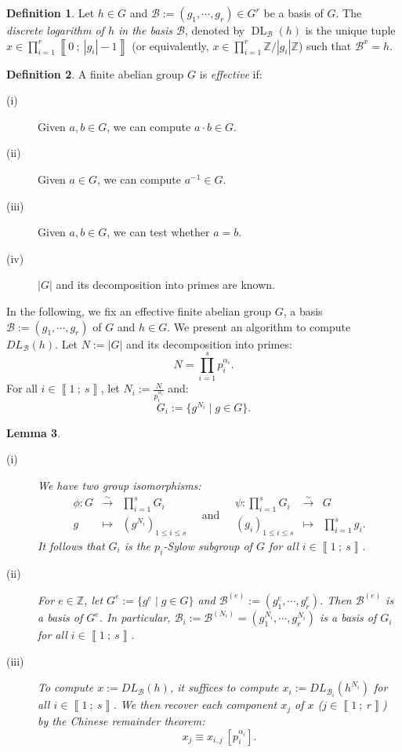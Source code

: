 \documentclass[a4paper,10pt]{report}
\theoremstyle{definition}
\newtheorem{Definition}{Definition}[chapter]
\theoremstyle{plain}
\newtheorem{Lemma}[Definition]{Lemma}
\theoremstyle{definition}
\newcommand{\Z}{\mathbb{Z}}
\newcommand{\m}[1]{\mathcal{#1}}
\renewcommand{\i}[2]{\left\llbracket #1~;~#2\right\rrbracket}
\renewcommand{\(}{\left(}
\renewcommand{\)}{\right)}
\DeclareMathOperator{\DL}{DL}
\begin{document}
\begin{Definition}\label{Definition 5}
Let $h\in G$ and $\m{B}:=(g_1,\cdots, g_r)\in G^r$ be a basis of $G$. The \emph{discrete logarithm of $h$ in the basis $\m{B}$}, denoted by $\DL_{\m{B}}(h)$ is the unique tuple $x\in\prod_{i=1}^r\i{0}{|g_i|-1}$ (or equivalently, $x\in\prod_{i=1}^r\Z/|g_i|\Z$)  such that $\m{B}^x=h$. 
\end{Definition}

\begin{Definition}
A finite abelian group $G$ is \emph{effective} if: 
\begin{description}
\item[(i)] Given $a, b\in G$, we can compute $a\cdot b\in G$.
\item[(ii)] Given $a\in G$, we can compute $a^{-1}\in G$.
\item[(iii)] Given $a, b\in G$, we can test whether $a=b$.
\item[(iv)] $|G|$ and its decomposition into primes are known.
\end{description}
\end{Definition}

In the following, we fix an effective finite abelian group $G$, a basis $\m{B}:=(g_1,\cdots, g_r)$ of $G$ and $h\in G$. We present an algorithm to compute $DL_{\m{B}}(h)$. Let $N:=|G|$ and its decomposition into primes:
\[N=\prod_{i=1}^s p_i^{\alpha_i}.\]
For  all $i\in\i{1}{s}$, let $N_i:=\frac{N}{p_i^{\alpha_i}}$ and:
\[G_i:=\{g^{N_i}\mid g\in G\}.\]

\begin{Lemma}\label{Lemma 11}
\begin{description}
\item[(i)] We have two group isomorphisms:
\[\begin{array}{rcl}
\phi : G&\overset{\sim}{\longrightarrow}&\prod_{i=1}^s G_i\\
g&\longmapsto & (g^{N_i})_{1\leq i\leq s}
\end{array} \quad \mbox{and} \quad \begin{array}{rcl}
\psi : \prod_{i=1}^s G_i &\overset{\sim}{\longrightarrow}& G\\
(g_i)_{1\leq i\leq s} &\longmapsto & \prod_{i=1}^s g_i.
\end{array}\]
It follows that $G_i$ is the $p_i$-Sylow subgroup of $G$ for all $i\in\i{1}{s}$.

\item[(ii)] For $e\in\Z$, let $G^e:=\{g^e\mid g\in G\}$ and $\m{B}^{(e)}:=(g_1^e, \cdots, g_r^e)$. Then $\m{B}^{(e)}$ is a basis of $G^e$.  In particular, $\m{B}_i:=\m{B}^{(N_i)}=(g_1^{N_i},\cdots, g_r^{N_i})$ is a basis of $G_i$ for all $i\in\i{1}{s}$.

\item[(iii)] To compute $x:=DL_{\m{B}}(h)$, it suffices to compute $x_i:=DL_{\m{B}_i}(h^{N_i})$ for all $i\in\i{1}{s}$. We then recover each component $x_j$ of $x$ ($j\in\i{1}{r}$) by the Chinese remainder theorem:
\[x_j\equiv x_{i, j} \ [p_i^{\alpha_i}].\]
\end{description}
\end{Lemma}
\end{document}
